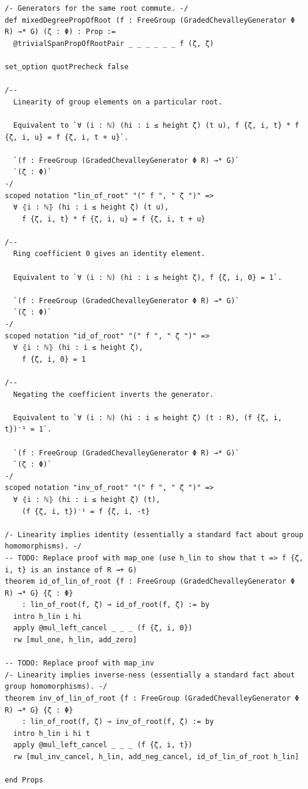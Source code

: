 \begin{Verbatim}
/- Generators for the same root commute. -/
def mixedDegreePropOfRoot (f : FreeGroup (GradedChevalleyGenerator Φ R) →* G) (ζ : Φ) : Prop :=
  @trivialSpanPropOfRootPair _ _ _ _ _ _ f (ζ, ζ)

set_option quotPrecheck false

/--
  Linearity of group elements on a particular root.

  Equivalent to `∀ (i : ℕ) (hi : i ≤ height ζ) (t u), f {ζ, i, t} * f {ζ, i, u} = f {ζ, i, t + u}`.

  `(f : FreeGroup (GradedChevalleyGenerator Φ R) →* G)`
  `(ζ : Φ)`
-/
scoped notation "lin_of_root" "(" f ", " ζ ")" =>
  ∀ ⦃i : ℕ⦄ (hi : i ≤ height ζ) (t u),
    f {ζ, i, t} * f {ζ, i, u} = f {ζ, i, t + u}

/--
  Ring coefficient 0 gives an identity element.

  Equivalent to `∀ (i : ℕ) (hi : i ≤ height ζ), f {ζ, i, 0} = 1`.

  `(f : FreeGroup (GradedChevalleyGenerator Φ R) →* G)`
  `(ζ : Φ)`
-/
scoped notation "id_of_root" "(" f ", " ζ ")" =>
  ∀ ⦃i : ℕ⦄ (hi : i ≤ height ζ),
    f {ζ, i, 0} = 1

/--
  Negating the coefficient inverts the generator.

  Equivalent to `∀ (i : ℕ) (hi : i ≤ height ζ) (t : R), (f {ζ, i, t})⁻¹ = 1`.

  `(f : FreeGroup (GradedChevalleyGenerator Φ R) →* G)`
  `(ζ : Φ)`
-/
scoped notation "inv_of_root" "(" f ", " ζ ")" =>
  ∀ ⦃i : ℕ⦄ (hi : i ≤ height ζ) (t),
    (f {ζ, i, t})⁻¹ = f {ζ, i, -t}

/- Linearity implies identity (essentially a standard fact about group homomorphisms). -/
-- TODO: Replace proof with map_one (use h_lin to show that t => f {ζ, i, t} is an instance of R →+ G)
theorem id_of_lin_of_root {f : FreeGroup (GradedChevalleyGenerator Φ R) →* G} {ζ : Φ}
    : lin_of_root(f, ζ) → id_of_root(f, ζ) := by
  intro h_lin i hi
  apply @mul_left_cancel _ _ _ (f {ζ, i, 0})
  rw [mul_one, h_lin, add_zero]

-- TODO: Replace proof with map_inv
/- Linearity implies inverse-ness (essentially a standard fact about group homomorphisms). -/
theorem inv_of_lin_of_root {f : FreeGroup (GradedChevalleyGenerator Φ R) →* G} {ζ : Φ}
    : lin_of_root(f, ζ) → inv_of_root(f, ζ) := by
  intro h_lin i hi t
  apply @mul_left_cancel _ _ _ (f {ζ, i, t})
  rw [mul_inv_cancel, h_lin, add_neg_cancel, id_of_lin_of_root h_lin]

end Props


\end{Verbatim}
